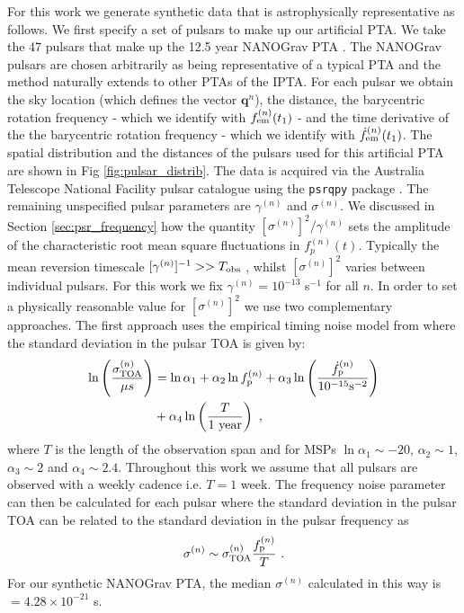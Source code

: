 \documentclass[fleqn,usenatbib,useAMS]{mnras}
\begin{document}
For this work we generate synthetic data that is astrophysically representative as follows. We first specify a set of pulsars to make up our artificial PTA. We take the 47 pulsars that make up the 12.5 year NANOGrav PTA \citep{2020ApJ...905L..34A}. The NANOGrav pulsars are chosen arbitrarily as being representative of a typical PTA and the method naturally extends to other PTAs of the IPTA. For each pulsar we obtain the sky location (which defines the vector $\boldsymbol{q}^{n}$), the distance, the barycentric rotation frequency - which we identify with $f_{\rm em}^{(n)} (t_1)$ -  and the time derivative of the the barycentric rotation frequency - which we identify with $\dot{f}_{\rm em}^{(n)} (t_1)$. The spatial distribution and the distances of the pulsars used for this artificial PTA are shown in Fig \ref{fig:pulsar_distrib}. The data is acquired via the Australia Telescope National Facility pulsar catalogue \citep{Manchester2005} using the \texttt{psrqpy} package \citep{psrqpy}. The remaining unspecified pulsar parameters are $\gamma^{(n)}$ and $\sigma^{(n)}$. We discussed in Section \ref{sec:psr_frequency} how the quantity $[\sigma^{(n)}]^2 /\gamma^{(n)} $ sets the amplitude of the characteristic root mean square fluctuations in $f_p^{(n)}(t)$. Typically the mean reversion timescale $[\gamma^{(n)}]^{-1} >> T_{\rm obs}$ \citep{Vargas}, whilst $[\sigma^{(n)}]^2$ varies between individual pulsars. For this work we fix $\gamma^{(n)} = 10^{-13}$ s$^{-1}$ for all $n$. In order to set a physically reasonable value for $[\sigma^{(n)}]^2$ we use two complementary approaches. The first approach uses the empirical timing noise model from \cite{Shannon2010ApJ...725.1607S} where the standard deviation in the pulsar TOA is given by:
\begin{align}
	\ln \left(\frac{\sigma_{\rm TOA}^{(n)}}{\mu s} \right)&= \ln \alpha_1 +  \alpha_2 \ln f_{\rm p}^{(n)} + \alpha_3 \ln \left(\frac{\dot{f}_{\rm p}^{(n)}}{10^{-15} \text{s}^{-2}} \right) \nonumber \\ 
	&+ \alpha_4 \ln \left( \frac{T}{ 1 \text{ year}} \right) \ , \label{eq:sigmap}
\end{align}
where $T$ is the length of the observation span and for MSPs $\ln \alpha_1 \sim -20 $, $\alpha_2 \sim 1$, $\alpha_3 \sim 2$ and $\alpha_4 \sim 2.4$. Throughout this work we assume that all pulsars are observed with a weekly cadence i.e. $T = 1$ week. The frequency noise parameter can then be calculated for each pulsar where the standard deviation in the pulsar TOA can be related to the standard deviation in the pulsar frequency as 
\begin{eqnarray}
	\sigma^{(n)} \sim \sigma_{\rm TOA}^{(n)} \frac{f_{\rm p}^{(n)}}{T} \ . \label{eq:sigmap_f}
\end{eqnarray}
For our synthetic NANOGrav PTA, the median $\sigma^{(n)}$ calculated in this way is $ = 4.28 \times 10^{-21} $ s. \newline 
\end{document}
